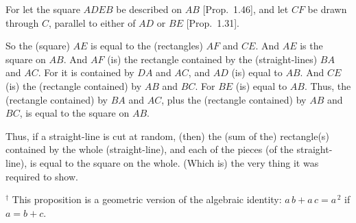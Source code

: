 \begin{Parallel}{}{}
{For let the square $ADEB$ be described on $AB$ [Prop.~1.46], and
let $CF$ be drawn through $C$, parallel to either of $AD$ or $BE$ [Prop.~1.31].

So the (square) $AE$ is equal to the (rectangles) $AF$ and $CE$. And $AE$ is the square on $AB$.  And $AF$ (is) the rectangle contained by the (straight-lines) $BA$ and $AC$. For it is contained by $DA$ and $AC$, and $AD$ (is) equal to $AB$. 
And $CE$ (is) the (rectangle contained) by $AB$ and $BC$. For $BE$ (is) equal
to $AB$. Thus, the (rectangle contained) by $BA$ and $AC$, plus the
(rectangle contained) by $AB$ and $BC$, is equal to the square on $AB$.

Thus, if a straight-line is cut at random,  (then) the (sum of the) rectangle(s) contained by the whole
(straight-line), and each of the pieces (of the straight-line), is equal to the square on the whole. (Which is) the very thing it was required to show.}
\end{Parallel}
{\footnotesize \noindent$^\dag$ This proposition is a geometric version
of the algebraic identity: $a\,b+a\,c=a^{\,2}$ if $a=b+c$.}

